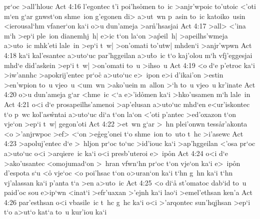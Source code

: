 pr`oc
>all'hlouc\bibvsend
\vs Act 4:16
l'egontec
t'i
poi'hs\r{o}men
to~ic
>anjr'wpoic
to'utoic
<'oti
m`en
g`ar
gnwst`on
shme~ion
g'egonen
di>
a>ut~wn
p~asin
to~ic
katoiko~usin
<ierousal`hm
vfaner`on
ka`i
o>u
dun'ameja
>ar\r{n}'hsasjai\bibvsend
{}
\vs Act 4:17
>all>
<'ina
m`h
>ep`i
ple~ion
dianemhj~h|
e>ic
t`on
la`on
>a\r{p}eil~h|
>apeilhs'wmeja
a>uto~ic
mhk'eti
lale~in
>ep`i
t~w|
>on'omati
to'utw|
mhden`i
>anjr'wpwn\bibvsend
\vs Act 4:18
ka`i
kal'esantec
a>uto`uc
par'hggeilan
a>u\r{t}o~ic
t`o
kaj'olou
m`h
vfj'eggesjai
mhd`e
did'askein
>ep`i
t~w|
>on'omati
to~u
>ihso~u\bibvsend
\vs Act 4:19
<o
d`e
p'etroc
ka`i
>iw'annhc
>apokrij'entec
pr`oc\r{}
a>uto`uc
e>~ipon
e>i
d'ikai'on
>estin
>en'wpion
to~u
vjeo~u
<um~wn
>ako'uein
m~allon
>`h
to~u
vjeo~u
kr'inate\bibvsend
\vs Act 4:20
o>u
dun'ameja
g`ar
<hme~ic
<`a
e>'id\r{o}men
ka`i
>hko'usamen
m`h
lale~in\bibvsend
\vs Act 4:21
o<i
d`e
prosapeilhs'amenoi
>ap'elusan
a>uto`uc
mhd`en
e<ur'iskontec
t`o
p~wc
kol'as\r{w}ntai
a>uto`uc
di`a
t`on
la`on
<'oti
p'antec
>ed'oxazon
t`on
vje`on
>ep`i
t~w|
gegon'oti\bibvsend
\vs Act 4:22
>et~wn
g`ar
>~hn
plei'onwn
tess\r{a}r'akonta
<o
>'anjrwpoc
>ef>
<`on
>e\r{g}eg'onei
t`o
shme~ion
to~uto
t~hc
>i'asewc\bibvsend
\vs Act 4:23
>apoluj'entec
d`e
>~hljon
pr`oc
to`uc
>id'iouc
ka`i
>ap'hggeilan
<'osa
pr`oc
a>uto`uc
o<i
>arqiere~ic
ka`i
o<i
presb'uteroi
e>~ip\r{o}n\bibvsend
{}
\vs Act 4:24
o<i
d`e
>ako'usantec
<omojumad`on
>~hran
vfwn`hn
pr`oc
t`on
vje`on
ka`i
e>~ip\r{o}n
d'espota
s`u
<o\r{}
vje`oc
<o
poi'hsac
t`on
o>uran`on
ka`i
t`hn
g~hn
ka`i
t`hn
vj'alassan
ka`i
p'anta
t`a
>en
a>uto~ic\bibvsend
\vs Act 4:25
<o
di`a\r{}
st'omatoc
dab`id
to~u
paid'oc
sou
e>ip`wn
<inat`i
>efr'uaxan
>'ejnh
ka`i
lao`i
>emel'ethsan
ken'a\bibvsend
\vs Act 4:26
par'esthsan
o<i
vbasile~ic
t~hc
g~hc
ka`i
o<i
>'arqontec
sun'hqjhsan
>ep`i
t`o
a>ut`o
kat`a
to~u
kur'iou
ka`i
